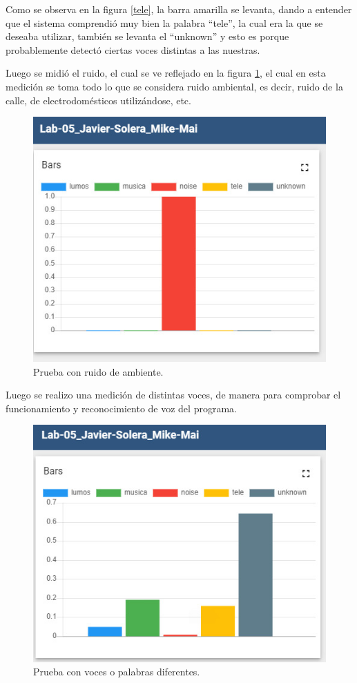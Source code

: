 Como se observa en la figura \ref{tele}, la barra amarilla se levanta, dando a entender que el sistema comprendió muy bien la palabra ``tele'', la cual era la que se deseaba utilizar, también se levanta el ``unknown'' y esto es porque probablemente detectó ciertas voces distintas a las nuestras. 

Luego se midió el ruido, el cual se ve reflejado en la figura \ref{noise}, el cual en esta medición se toma todo lo que se considera ruido ambiental, es decir, ruido de la calle, de electrodomésticos utilizándose, etc. 

\begin{figure}[H]
    \centering
    \includegraphics[width=\textwidth]{Imagenes/noise.jpg}
    \caption{Prueba con ruido de ambiente.}
    \label{noise}
\end{figure}

Luego se realizo una medición de distintas voces, de manera para comprobar el funcionamiento y reconocimiento de voz del programa.

\begin{figure}[H]
    \centering
    \includegraphics[width=\textwidth]{Imagenes/unknown.jpg}
    \caption{Prueba con voces o palabras diferentes.}
    \label{unknown}
\end{figure}

